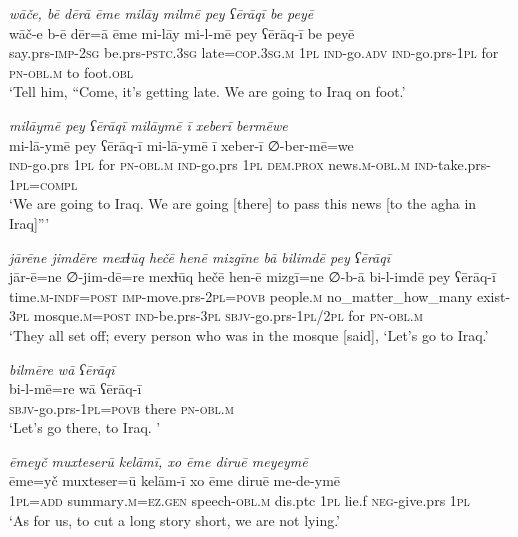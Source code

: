 \ea \label{BP.78}
\textit{wāče, bē dērā ēme milāy milmē pey ʕērāqī be peyē} \\ 
\gll wāč-e b-ē dēr=ā ēme mi-lāy mi-l-mē pey ʕērāq-ī be peyē \\ 
 say.prs-\textsc{imp-}\textsc{2sg} be.prs\textsc{-pstc}\textsc{.3sg} late\textsc{=cop}\textsc{.3sg}\textsc{.m} \textsc{1pl} \textsc{ind-}go\textsc{.adv} \textsc{ind-}go.prs\textsc{-\textsc{1pl}} for \textsc{pn}\textsc{-obl}\textsc{.m} to foot\textsc{.obl} \\ 
\glt `Tell him, “Come, it’s getting late. We are going to Iraq on foot.'
\z 
 
\ea \label{BP.79}
\textit{milāymē pey ʕērāqī milāymē ī xeberī bermēwe} \\ 
\gll mi-lā-ymē pey ʕērāq-ī mi-lā-ymē ī xeber-ī ∅-ber-mē=we \\ 
 \textsc{ind-}go.prs \textsc{1pl} for \textsc{pn}\textsc{-obl}\textsc{.m} \textsc{ind-}go.prs \textsc{1pl} \textsc{dem.prox} news\textsc{.m}\textsc{-obl}\textsc{.m} \textsc{ind-}take.prs\textsc{-\textsc{1pl}}\textsc{=compl} \\ 
\glt `We are going to Iraq. We are going [there] to pass this news [to the agha in Iraq]”'
\z 
 
\ea \label{BP.87}
\textit{jārēne jimdēre mexɫūq hečē henē mizgīne bā bilimdē pey ʕērāqī} \\ 
\gll jār-ē=ne ∅-jim-dē=re mexɫūq hečē hen-ē mizgī=ne ∅-b-ā bi-l-imdē pey ʕērāq-ī \\ 
 time\textsc{.m}\textsc{-indf}\textsc{=\textsc{post}} \textsc{imp-}move.prs-\textsc{2pl}\textsc{=\textsc{povb}} people\textsc{.m} no\_matter\_how\_many exist\textsc{-3pl} mosque\textsc{.m}\textsc{=\textsc{post}} \textsc{ind-}be.prs\textsc{-3pl} \textsc{sbjv-}go.prs\textsc{-\textsc{1pl}}/\textsc{2pl} for \textsc{pn}\textsc{-obl}\textsc{.m} \\ 
\glt `They all set off; every person who was in the mosque [said], ‘Let’s go to Iraq.'
\z 
 
\ea \label{BP.88}
\textit{bilmēre wā ʕērāqī} \\ 
\gll bi-l-mē=re wā ʕērāq-ī \\ 
 \textsc{sbjv-}go.prs\textsc{-\textsc{1pl}}\textsc{=\textsc{povb}} there \textsc{pn}\textsc{-obl}\textsc{.m} \\ 
\glt `Let’s go there, to Iraq. '
\z 
 
\ea \label{BP.95}
\textit{ēmeyč muxteserū kelāmī, xo ēme diruē meyeymē} \\ 
\gll ēme=yč muxteser=ū kelām-ī xo ēme diruē me-de-ymē \\ 
 \textsc{1pl}\textsc{=add} summary\textsc{.m}\textsc{=ez.gen} speech\textsc{-obl}\textsc{.m} dis.ptc \textsc{1pl} lie.f \textsc{neg-}give.prs \textsc{1pl} \\ 
\glt `As for us, to cut a long story short, we are not lying.'
\z 
 
